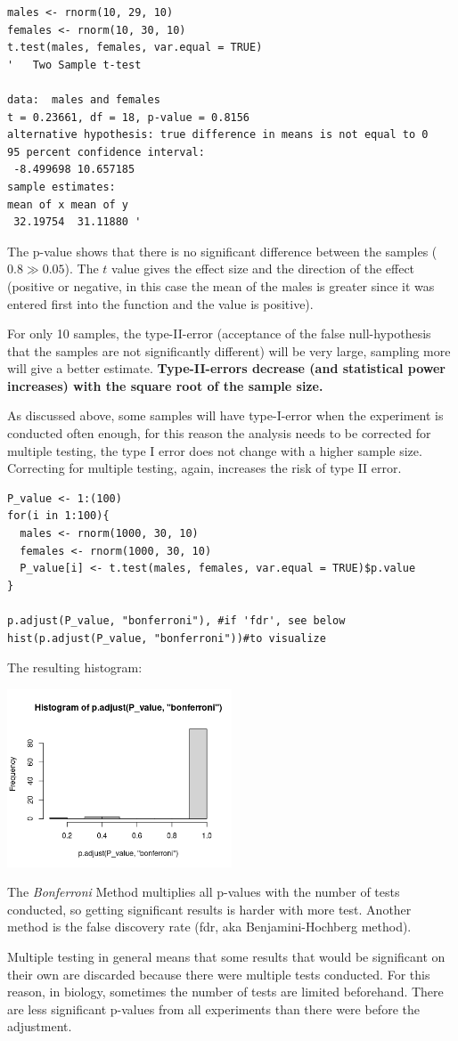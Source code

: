 \documentclass{article}
\begin{document}
\begin{lstlisting}
males <- rnorm(10, 29, 10)
females <- rnorm(10, 30, 10)
t.test(males, females, var.equal = TRUE)
'	Two Sample t-test

data:  males and females
t = 0.23661, df = 18, p-value = 0.8156
alternative hypothesis: true difference in means is not equal to 0
95 percent confidence interval:
 -8.499698 10.657185
sample estimates:
mean of x mean of y 
 32.19754  31.11880 '
\end{lstlisting}
The p-value shows that there is no significant difference between the samples ($0.8 \gg 0.05$). The $t$ value gives the effect size and the direction of the effect (positive or negative, in this case the mean of the males is greater since it was entered first into the function and the value is positive).\par
For only 10 samples, the type-II-error (acceptance of the false null-hypothesis that the samples are not significantly different) will be very large, sampling more will give a better estimate. \textbf{Type-II-errors decrease (and statistical power increases) with the square root of the sample size.}\par 
As discussed above, some samples will have type-I-error when the experiment is conducted often enough, for this reason the analysis needs to be corrected for multiple testing, the type I error does not change with a higher sample size. Correcting for multiple testing, again, increases the risk of type II error. \par
\begin{lstlisting}
P_value <- 1:(100)
for(i in 1:100){
  males <- rnorm(1000, 30, 10)
  females <- rnorm(1000, 30, 10)
  P_value[i] <- t.test(males, females, var.equal = TRUE)$p.value
}

p.adjust(P_value, "bonferroni"), #if 'fdr', see below
hist(p.adjust(P_value, "bonferroni"))#to visualize
\end{lstlisting}
The resulting histogram:
\begin{center}
    \includegraphics[width = 0.5\textwidth]{lab1/multiple_testing.png}
\end{center}
The \textit{Bonferroni} Method multiplies all p-values with the number of tests conducted, so getting significant results is harder with more test. Another method is the false discovery rate (fdr, aka Benjamini-Hochberg method).\par
Multiple testing in general means that some results that would be significant on their own are discarded because there were multiple tests conducted. For this reason, in biology, sometimes the number of tests are limited beforehand. There are less significant p-values from all experiments than there were before the adjustment.
\end{document}
